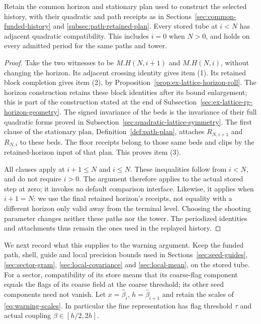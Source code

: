 \begin{lemma}
\label{lem:selected-tube-compatibility}
Retain the common horizon and stationary plan used to construct the
selected history, with their quadratic and path receipts as in
Sections~\ref{sec:common-funded-history} and
\ref{subsec:path-retained-plan}. Every stored tube at $i<N$ has
adjacent quadratic compatibility. This includes $i=0$ when $N>0$,
and holds on every admitted period for the same paths and tower.
\end{lemma}

\begin{proof}
Take the two witnesses to be $M.H(N,i+1)$ and $M.H(N,i)$, without
changing the horizon. Its adjacent crossing identity gives item (1).
Its retained block completion gives item (2), by
Proposition~\ref{prop:ex-lattice-horizon-roll}. The horizon construction
retains these block identities after its bound enlargement; this is
part of the construction stated at the end of
Subsection~\ref{sec:ex-lattice-rg-horizon-geometry}.
The signed invariance of the beds is the invariance of their full
quadratic forms proved in Subsection~\ref{sec:quadratic-lattice-symmetry}.
The first clause of the stationary plan, Definition~\ref{def:path-plan},
attaches $R_{N,i+1}$ and $R_{N,i}$ to these beds. The floor receipts
belong to those same beds and clips by the retained-horizon input of
that plan. This proves item (3).

All clauses apply at $i+1\le N$ and $i\le N$. These inequalities follow
from $i<N$, and do not require $i>0$. The argument therefore applies to
the actual stored step at zero; it invokes no default comparison interface.
Likewise, it applies when $i+1=N$: we use the final retained horizon's
receipts, not equality with a different horizon only valid away from
the terminal level. Choosing the shooting parameter changes neither
these paths nor the tower. The periodized identities and attachments
thus remain the ones used in the replayed history.
\end{proof}

We next record what this supplies to the warning argument. Keep the
funded path, shell, guide and local precision bounds used in
Sections~\ref{sec:seed-guides}, \ref{sec:sector-gram},
\ref{sec:local-covariance} and \ref{sec:local-mean}, on the stored tube.
For a sector, compatibility of its store means that its coarse-flag
component equals the flags of its coarse field at the coarse threshold;
its other seed components need not vanish. Let $x=\widehat\beta_i$,
$h=\widehat\beta_{i+1}$ and retain the scales of
\eqref{eq:warning-scales}. In particular the fine representation has
flag threshold $\tau$ and actual coupling $\beta\in[h/2,2h]$.

